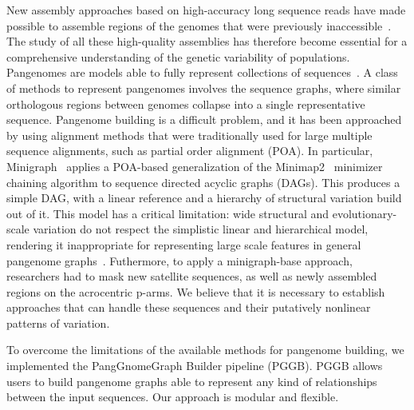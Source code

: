 \documentclass[pdflatex,sn-mathphys]{sn-jnl}%
\theoremstyle{thmstyleone}%
\theoremstyle{thmstyletwo}%
\theoremstyle{thmstylethree}%
\begin{document}
New assembly approaches based on high-accuracy long sequence reads have made possible to assemble regions of the genomes that were previously inaccessible~\cite{Nurk2021, Logsdon2021, Ebert2021}.
The study of all these high-quality assemblies has therefore become essential for a comprehensive understanding of the genetic variability of populations.
Pangenomes are models able to fully represent collections of sequences~\cite{Eizenga2020}.
A class of methods to represent pangenomes involves the sequence graphs, where similar orthologous regions between genomes collapse into a single representative sequence.
Pangenome building is a difficult problem, and it has been approached by using alignment methods that were traditionally used for large multiple sequence alignments, such as partial order alignment (POA)\cite{Lee2002}.
In particular, Minigraph~\cite{Li2020} applies a POA-based generalization of the Minimap2~\cite{Li2018} minimizer chaining algorithm to sequence directed acyclic graphs (DAGs).
This produces a simple DAG, with a linear reference and a hierarchy of structural variation build out of it.
This model has a critical limitation: wide structural and evolutionary-scale variation do not respect the simplistic linear and hierarchical model,
rendering it inappropriate for representing large scale features in general pangenome graphs~\cite{Sekar2016, Hollox2008, Vollger2021}.
Futhermore, to apply a minigraph-base approach, researchers had to mask new satellite sequences, as well as newly assembled regions on the acrocentric p-arms. %
We believe that it is necessary to establish approaches that can handle these sequences and their putatively nonlinear patterns of variation.

To overcome the limitations of the available methods for pangenome building, we implemented the PangGnomeGraph Builder pipeline (PGGB).
PGGB allows users to build pangenome graphs able to represent any kind of relationships between the input sequences.
Our approach is modular and flexible.




\end{document}
